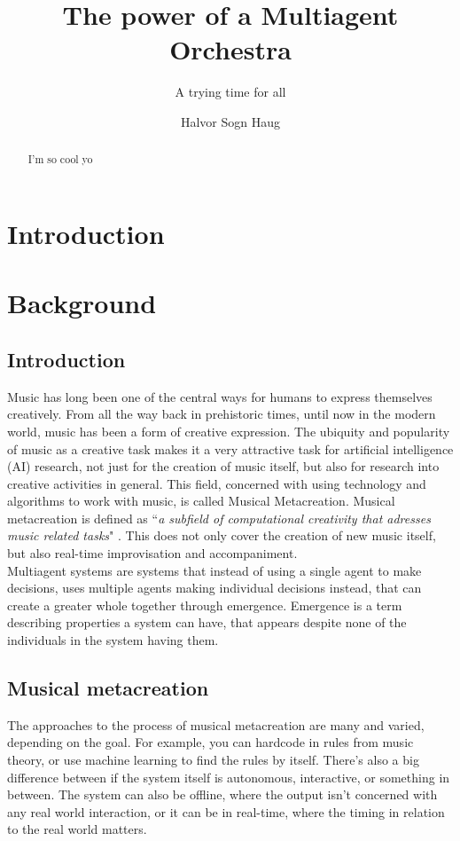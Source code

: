 \documentclass[a4paper,english]{report}
\title{The power of a Multiagent Orchestra}
\subtitle{A trying time for all}
\author{Halvor Sogn Haug}
\begin{document}
	\duoforside[dept={Institute of informatics},
	program={Informatics: Robotics and Intelligent Systems},
	long]
	\begin{abstract}
		I'm so cool yo
	\end{abstract}
	\tableofcontents
	\chapter{Introduction}
	\chapter{Background}
	\section{Introduction}
	Music has long been one of the central ways for humans to express themselves creatively. From all the way back in prehistoric times, until now in the modern world, music has been a form of creative expression. The ubiquity and popularity of music as a creative task makes it a very attractive task for artificial intelligence (AI) research, not just for the creation of music itself, but also for research into creative activities in general. This field, concerned with using technology and algorithms to work with music, is called Musical Metacreation. Musical metacreation is defined as ``\textit{a subfield of computational creativity that adresses music related tasks}" \cite{pasquier2017introduction}. This does not only cover the creation of new music itself, but also real-time improvisation and accompaniment.\\
	Multiagent systems are systems that instead of using a single agent to make decisions, uses multiple agents making individual decisions instead, that can create a greater whole  together through emergence. Emergence is a term describing properties a system can have, that appears despite none of the individuals in the system having them.
	
	\section{Musical metacreation}
	The approaches to the process of musical metacreation are many and varied, depending on the goal. For example, you can hardcode in rules from music theory, or use machine learning to find the rules by itself. There's also a big difference between if the system itself is autonomous, interactive, or something in between. The system can also be offline, where the output isn't concerned with any real world interaction, or it can be in real-time, where the timing in relation to the real world matters.
	
\end{document}
